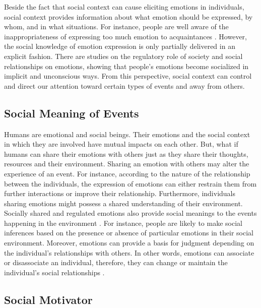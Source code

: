 \documentclass[11pt]{article}
\begin{document}
Beside the fact that social context can cause eliciting emotions in individuals,
social context provides information about what emotion should be expressed, by
whom, and in what situations. For instance, people are well aware of the
inappropriateness of expressing too much emotion to acquaintances
\cite{tiedens:social-life}. However, the social knowledge of emotion expression
is only partially delivered in an explicit fashion. There are studies on the
regulatory role of society and social relationships on emotions, showing that
people's emotions become socialized in implicit and unconscious ways. From this
perspective, social context can control and direct our attention toward certain
types of events and away from others.

\subsection{Social Meaning of Events}

Humans are emotional and social beings. Their emotions and the social context
in which they are involved have mutual impacts on each other. But, what if
humans can share their emotions with others just as they share their thoughts,
resources and their environment. Sharing an emotion with others may alter the
experience of an event. For instance, according to the nature of the
relationship between the individuals, the expression of emotions can either
restrain them from further interactions or improve their relationship.
Furthermore, individuals sharing emotions might possess a shared understanding
of their environment. Socially shared and regulated emotions also provide social
meanings to the events happening in the environment
\cite{wisecup:sociology-emotions}. For instance, people are likely to make
social inferences based on the presence or absence of particular emotions in
their social environment. Moreover, emotions can provide a basis for judgment
depending on the individual's relationships with others. In other words,
emotions can associate or disassociate an individual, therefore, they can change
or maintain the individual's social relationships \cite{tiedens:social-life}.

\subsection{Social Motivator}
\end{document}
